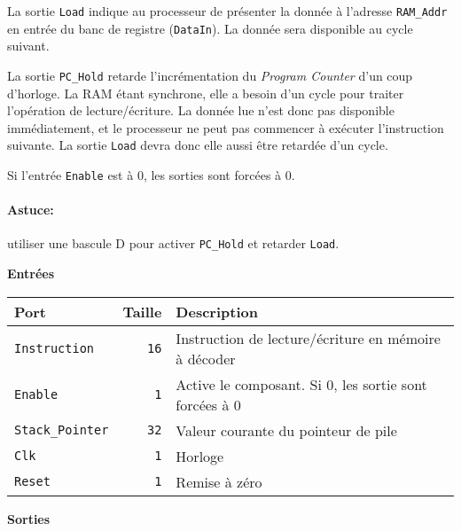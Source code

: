 La sortie \texttt{Load} indique au processeur de présenter la donnée à l'adresse \texttt{RAM\_Addr} en entrée du banc de registre (\texttt{DataIn}). La donnée sera disponible au cycle suivant.

La sortie \texttt{PC\_Hold} retarde l'incrémentation du \textit{Program Counter} d'un coup d'horloge. La RAM étant synchrone, elle a besoin d'un cycle pour traiter l'opération de lecture/écriture. La donnée lue n'est donc pas disponible immédiatement, et le processeur ne peut pas commencer à exécuter l'instruction suivante.
La sortie \texttt{Load} devra donc elle aussi être retardée d'un cycle.

Si l'entrée \texttt{Enable} est à 0, les sorties sont forcées à 0.

\paragraph{Astuce:} utiliser une bascule D pour activer \texttt{PC\_Hold} et retarder \texttt{Load}.


\textbf{Entrées}\\

\begin{tabular}{|l|r|l|}
\hline
\textbf{Port}		& \textbf{Taille} & \textbf{Description}\\
\hline

\texttt{Instruction}	& \texttt{16} & Instruction de lecture/écriture en mémoire à décoder\\
\hline
\texttt{Enable}		&  \texttt{1} & Active le composant. Si 0, les sortie sont forcées à 0\\
\hline
\texttt{Stack\_Pointer}	& \texttt{32} & Valeur courante du pointeur de pile\\
\hline
\texttt{Clk}		&  \texttt{1} & Horloge\\
\hline
\texttt{Reset}		&  \texttt{1} & Remise à zéro\\


\hline
\end{tabular}

\vspace{1em}
\textbf{Sorties}\\


